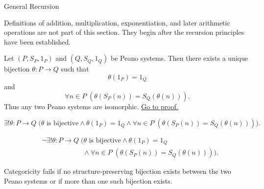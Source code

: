 \begin{topicbox}{General Recursion}
\begin{remark*}
Definitions of addition, multiplication, exponentiation, and later arithmetic
operations are not part of this section. They begin after the recursion
principles have been established.
\end{remark*}

\begin{tcolorbox}[colback=thmbox, colframe=thmborder, arc=2pt,
  left=6pt, right=6pt, top=4pt, bottom=4pt,
  title={\small\textbf{Theorem (Uniqueness of Peano Systems up to Isomorphism)}},
  fonttitle=\small\bfseries]
\begin{theorem}
\label{thm:uniqueness-of-peano-systems-up-to-isomorphism}
Let $(P,S_P,1_P)$ and $(Q,S_Q,1_Q)$ be Peano systems. Then there exists a
unique bijection $\theta:P\to Q$ such that
\[
\theta(1_P)=1_Q
\]
and
\[
\forall n\in P\;(\theta(S_P(n))=S_Q(\theta(n))).
\]
Thus any two Peano systems are isomorphic.
\hyperref[prf:uniqueness-of-peano-systems-up-to-isomorphism]{Go to proof.}
\end{theorem}
\end{tcolorbox}

\begin{remark*}
\[
\exists! \theta:P\to Q\;
\bigl(\theta \text{ is bijective}\land \theta(1_P)=1_Q
\land \forall n\in P\;(\theta(S_P(n))=S_Q(\theta(n)))\bigr).
\]
\end{remark*}


\begin{remark*}
\[
\begin{aligned}
&\neg\exists! \theta:P\to Q\;
\bigl(\theta \text{ is bijective}\land \theta(1_P)=1_Q\\
&\qquad\qquad\qquad\land
\forall n\in P\;(\theta(S_P(n))=S_Q(\theta(n)))\bigr).
\end{aligned}
\]
\end{remark*}

\begin{remark*}
Categoricity fails if no structure-preserving bijection exists between the two
Peano systems or if more than one such bijection exists.
\end{remark*}


\end{topicbox}
